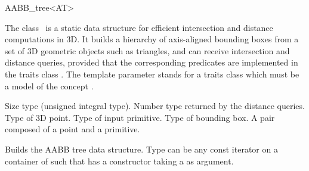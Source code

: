 \ccRefPageBegin


\begin{ccRefClass}{AABB_tree<AT>}  %


\ccDefinition
  
The class \ccRefName\ is a static data structure for efficient intersection and distance computations in 3D. It builds a hierarchy of axis-aligned bounding boxes from a set of 3D geometric objects such as triangles, and can receive intersection and distance queries, provided that the corresponding predicates are implemented in the traits class . The template parameter  stands for a traits class which must be a model of the concept .


\ccTypes

             {Size type (unsigned integral type).}
\ccGlue
{}
          {Number type returned by the distance queries.}
\ccGlue
{}
          {Type of 3D point.}
\ccGlue
{}
          {Type of input primitive.}
\ccGlue
{}
          {Type of bounding box.}
\ccGlue
{}
             {A pair composed of a point and a primitive.}


\ccCreation
{} %

{Builds the AABB tree data structure. Type  can be any const iterator on a container of  such that  has a constructor taking a  as argument.}


\end{ccRefClass}
